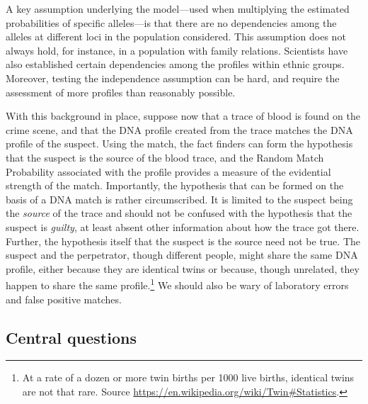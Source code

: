 \documentclass[10pt]{article}
\begin{document}
A key assumption underlying the model---used when multiplying the estimated probabilities of specific alleles---is that there are no 
dependencies among the alleles at different loci in the population considered. This assumption does not always hold, for instance, in a population 
with family relations. Scientists have also established certain dependencies among the profiles within ethnic groups. 
Moreover, testing the independence assumption can be hard, and require the assessment of more profiles than reasonably possible. 

With this background in place, suppose now that a trace of blood is found on the crime scene, and that the DNA profile created from the trace matches the DNA profile of the suspect. Using the match, 
the fact finders can form the hypothesis that the suspect is the source of the blood trace, and the Random Match Probability associated with the profile provides 
a measure of the evidential strength of the match. %
Importantly, the hypothesis that can be formed on the basis of a DNA 
match is rather circumscribed. It is limited to the suspect being the \textit{source} of the trace and 
should not be confused with the hypothesis that the suspect is \textit{guilty}, at least 
absent other information about how the trace got there. 
Further, the hypothesis itself that the suspect is the source 
need not be true. The suspect and the perpetrator, though different people, might share 
the same DNA profile, either because they are identical twins or because, though unrelated, 
they happen to share the same profile.\footnote{At a rate of a dozen or more twin births per 1000 live births, identical twins are not that rare. 
Source \url{https://en.wikipedia.org/wiki/Twin\#Statistics}.} We should also be wary 
of laboratory errors and false positive matches. 


\subsection{Central questions}
\end{document}

